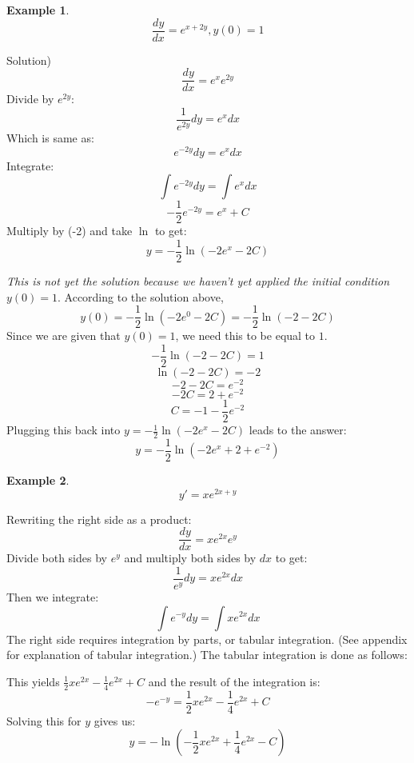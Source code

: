\documentclass[12pt]{report}
\newtheorem{ex}{Example}[section]
\begin{document}
\begin{ex}
	$$\frac{dy}{dx}= e^{x+2y}, y(0)=1 $$
\end{ex}
Solution)
$$\frac{dy}{dx}= e^x e^{2y} $$
Divide by $e^{2y}$:
$$\frac{1}{e^{2y}} dy = e^x dx $$
Which is same as:
$$e^{-2y} dy = e^x dx $$
Integrate:
$$\int e^{-2y} dy = \int e^x dx $$
$$ -\frac{1}{2} e^{-2y} = e^x +C $$
Multiply by (-2) and take $ \ln $ to get:
$$ y = -\frac{1}{2} \ln{(-2 e^x -2C)} $$

\textit{This is not yet the solution because we haven't yet applied the initial condition} $ y(0)=1 $. According to the solution above,
$$y(0) = -\frac{1}{2} \ln{(-2 e^0 -2C)} = -\frac{1}{2} \ln{(-2 -2C)}$$
Since we are given that $ y(0)=1 $, we need this to be equal to $1$.
$$-\frac{1}{2} \ln{(-2 -2C)}=1$$
$$\ln{(-2 -2C)}=-2$$
$$ -2-2C = e^{-2} $$
$$ -2C=2+e^{-2} $$
$$ C = -1 -\frac{1}{2}e^{-2} $$
Plugging this back into $ y = -\frac{1}{2} \ln{(-2 e^x -2C)} $ leads to the answer:
$$ y = -\frac{1}{2} \ln{(-2 e^x + 2+e^{-2})} $$

\begin{ex}
	$$ y' = x e^{2x+y} $$
\end{ex}
Rewriting the right side as a product:
$$ \frac{dy}{dx} = x e^{2x} e^y $$
Divide both sides by $e^y$ and multiply both sides by $dx$ to get:
$$\frac{1}{e^y} dy = x e^{2x} dx $$
Then we integrate:
$$\int e^{-y} dy = \int x e^{2x} dx $$
The right side requires integration by parts, or tabular integration. (See appendix for explanation of tabular integration.) The tabular integration is done as follows: 
\begin{center}  \end{center}
 This yields $\frac{1}{2} x e^{2x} - \frac{1}{4} e^{2x}+C$ and the result of the integration is:
$$-e^{-y} = \frac{1}{2} x e^{2x} - \frac{1}{4} e^{2x}+C$$
Solving this for $y$ gives us:
$$y = - \ln {(-\frac{1}{2} x e^{2x} + \frac{1}{4} e^{2x}-C)}$$
\end{document}
